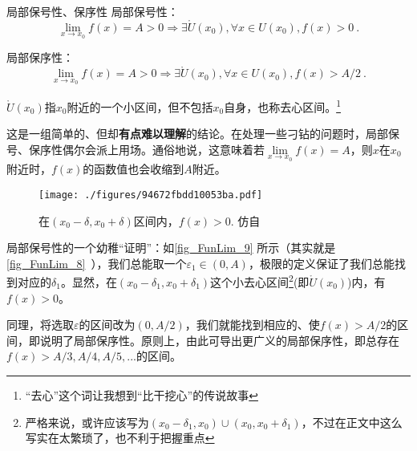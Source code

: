 \begin{theorem}{局部保号性、保序性}
局部保号性：
\begin{equation}
\lim_{x\to x_0}f(x)=A>0\Rightarrow \exists \mathring{U} (x_0), \forall x \in U(x_0), f(x)>0~.
\end{equation}

局部保序性：
\begin{equation}
\lim_{x\to x_0}f(x)=A>0 \Rightarrow \exists \mathring{U} (x_0), \forall x \in U(x_0), f(x)>A/2~.
\end{equation}

$\mathring{U} (x_0)$指$x_0$附近的一个小区间，但不包括$x_0$自身，也称去心区间。\footnote{“去心”这个词让我想到“比干挖心”的传说故事}

这是一组简单的、但却\textbf{有点难以理解}的结论。在处理一些刁钻的问题时，局部保号、保序性偶尔会派上用场。通俗地说，这意味着若$\lim\limits_{x\to x_0}f(x)=A$，则$x$在$x_0$附近时，$f(x)$的函数值也会收缩到$A$附近。

\begin{figure}[ht]
\centering
\texttt{[image: ./figures/94672fbdd10053ba.pdf]}
\caption{在$(x_0-\delta, x_0+\delta)$区间内，$f(x)>0$. 仿自\cite{Thomas}} \label{fig_FunLim_9}
\end{figure}
局部保号性的一个幼稚“证明”：如\autoref{fig_FunLim_9} 所示（其实就是\autoref{fig_FunLim_8}~），我们总能取一个$\varepsilon_1 \in (0,A)$，极限的定义保证了我们总能找到对应的$\delta_1$。显然，在$(x_0-\delta_1, x_0+\delta_1)$这个小去心区间\footnote{严格来说，或许应该写为$(x_0-\delta_1,x_0)\cup(x_0, x_0+\delta_1)$，不过在正文中这么写实在太繁琐了，也不利于把握重点}(即$\mathring{U} ({x_0})$)内，有$f(x)>0$。

同理，将选取$\varepsilon$的区间改为$(0,A/2)$，我们就能找到相应的、使$f(x)>A/2$的区间，即说明了局部保序性。原则上，由此可导出更广义的局部保序性，即总存在$f(x)>A/3,A/4,A/5,...$的区间。

\end{theorem}

